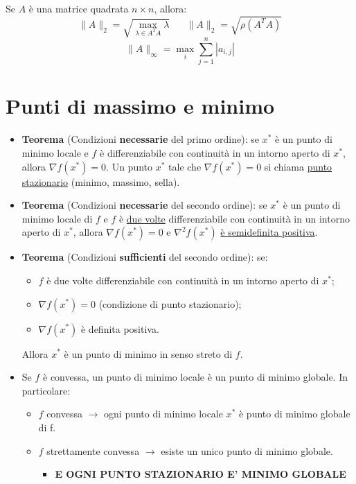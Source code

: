 \documentclass{article}
\newcommand\norm[1]{\lVert#1\rVert}	%
\begin{document}
		Se $A$ è una matrice quadrata $n \times n$, allora:
		\[
			\norm{A}_2 = \sqrt{\max_{\lambda \in A^T A} \lambda} \;\;\;\;\;\; \norm{A}_2 = \sqrt{\rho ( A^T A )}
		\]
		\[
			\norm{A}_\infty = \max_{i} \sum_{j=1}^{n} |a_{i,j}|
		\]

	\section{Punti di massimo e minimo}

		\begin{itemize}
			\item \textbf{Teorema} (Condizioni \textbf{necessarie} del primo ordine): se $x^*$ è un punto di minimo locale e $f$ è differenziabile con continuità in un intorno aperto di $x^*$, allora $\nabla f(x^*) = 0$. Un punto $x^*$ tale che $\nabla f(x^*) = 0$ si chiama \underline{punto stazionario} (minimo, massimo, sella).
			\item \textbf{Teorema} (Condizioni \textbf{necessarie} del secondo ordine): se $x^*$ è un punto di minimo locale di $f$ e $f$ è \underline{due volte} differenziabile con continuità in un intorno aperto di $x^*$, allora $\nabla f(x^*) = 0$ e $\nabla ^2 f(x^*)$ \underline{è semidefinita positiva}.
			\item \textbf{Teorema} (Condizioni \textbf{sufficienti} del secondo ordine): se:
			\begin{itemize}
				\item $f$ è due volte differenziabile con continuità in un intorno aperto di $x^*$;
				\item $\nabla f(x^*) = 0$ (condizione di punto stazionario);
				\item $\nabla f(x^*)$ è definita positiva.
			\end{itemize}
			Allora $x^*$ è un punto di minimo in senso streto di $f$.
			\item Se $f$ è convessa, un punto di minimo locale è un punto di minimo globale. In particolare:
			\begin{itemize}
				\item $f$ convessa $\rightarrow$ ogni punto di minimo locale $x^*$ è punto di minimo globale di f.
				\item $f$ strettamente convessa $\rightarrow$ esiste un unico punto di minimo globale.
				\begin{itemize}
					\item \textbf{E OGNI PUNTO STAZIONARIO E' MINIMO GLOBALE}
				\end{itemize}
			\end{itemize}
		\end{itemize}
\end{document}
